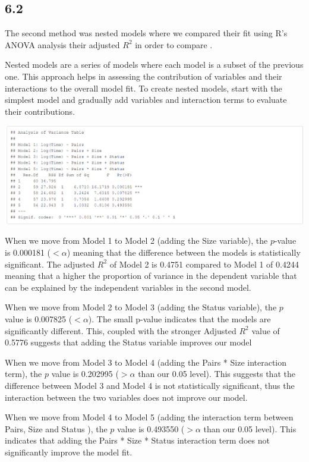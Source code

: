 \documentclass{article}
\begin{document}
\subsection*{6.2}

The second method was nested models where we compared their fit using R's ANOVA analysis their adjusted $R^2$ in order to compare .

Nested models are a series of models where each model is a subset of the previous one. This approach helps in assessing the contribution of variables and their interactions to the overall model fit. To create nested models, start with the simplest model and gradually add variables and interaction terms to evaluate their contributions.


\includegraphics[scale=0.5]{tables/variance-table.png}


When we move from Model 1 to Model 2 (adding the Size variable), the $p$-value is 0.000181 ($< \alpha$) meaning that the difference between the models is statistically significant. The adjusted $R^2$ of Model 2 is 0.4751 compared to Model 1 of 0.4244 meaning that a higher the proportion of variance in the dependent variable that can be explained by the independent variables in the second model.

When we move from Model 2 to Model 3 (adding the Status variable), the $p$ value is 0.007825 ($< \alpha$). The small p-value indicates that the models are significantly different. This, coupled with the stronger Adjusted $R^2$ value of 0.5776 suggests that adding the Status variable improves our model

When we move from Model 3 to Model 4 (adding the Pairs * Size interaction term), the $p$ value is 0.202995 ($>\alpha$  than our 0.05 level). This suggests that the difference between Model 3 and Model 4 is not statistically significant, thus the interaction between the two variables does not improve our model.

When we move from Model 4 to Model 5 (adding the interaction term between Pairs,  Size and Status ), the $p$ value is 0.493550 ($>\alpha$  than our 0.05 level). This indicates that adding the Pairs * Size * Status interaction term does not significantly improve the model fit.
\end{document}
